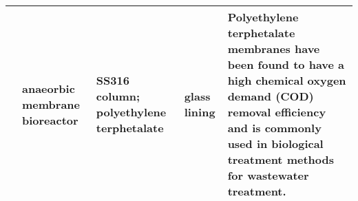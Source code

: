 {\begin{tabular}{@{}lp{5cm}p{2cm}p{2cm}p{12cm}@{}}
                                                      & anaeorbic membrane bioreactor                          & SS316 column; polyethylene terphetalate                                                 & glass lining                                      & Polyethylene terphetalate membranes have been found to have a high chemical oxygen demand (COD) removal efficiency and is commonly used in biological treatment methods for wastewater treatment.                                                                                                                                                                                                                                                                                                                                                                                                                                                                                                                                                                                                                                                                                                                  \\ \bottomrule
\end{tabular}%
}